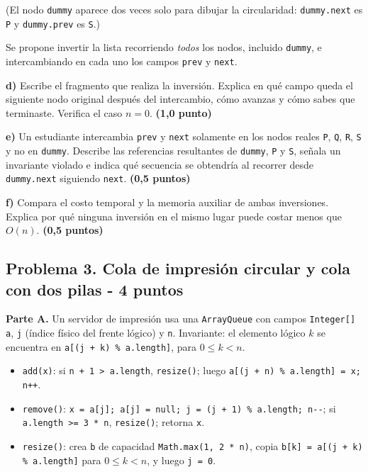 \documentclass[11pt,a4paper]{article}
\newcommand{\pts}[1]{\textbf{(#1)}}
\begin{document}
(El nodo \texttt{dummy} aparece dos veces solo para dibujar la circularidad: \texttt{dummy.next} es \texttt{P} y \texttt{dummy.prev} es \texttt{S}.)

Se propone invertir la lista recorriendo \emph{todos} los nodos, incluido \texttt{dummy}, e intercambiando en cada uno los campos \texttt{prev} y \texttt{next}.

\textbf{d)} Escribe el fragmento que realiza la inversión. Explica en qué campo queda el siguiente nodo original después del intercambio, cómo avanzas y cómo sabes que terminaste. Verifica el caso $n = 0$. \pts{1,0 punto}

\textbf{e)} Un estudiante intercambia \texttt{prev} y \texttt{next} solamente en los nodos reales \texttt{P}, \texttt{Q}, \texttt{R}, \texttt{S} y no en \texttt{dummy}. Describe las referencias resultantes de \texttt{dummy}, \texttt{P} y \texttt{S}, señala un invariante violado e indica qué secuencia se obtendría al recorrer desde \texttt{dummy.next} siguiendo \texttt{next}. \pts{0,5 puntos}

\textbf{f)} Compara el costo temporal y la memoria auxiliar de ambas inversiones. Explica por qué ninguna inversión en el mismo lugar puede costar menos que $O(n)$. \pts{0,5 puntos}

\newpage
\subsection*{Problema 3. Cola de impresión circular y cola con dos pilas - 4 puntos}

\textbf{Parte A.} Un servidor de impresión usa una \texttt{ArrayQueue} con campos \texttt{Integer[] a}, \texttt{j} (índice físico del frente lógico) y \texttt{n}. Invariante: el elemento lógico $k$ se encuentra en \texttt{a[(j + k) \% a.length]}, para $0 \le k < n$.

\begin{itemize}[itemsep=0pt]
\item \texttt{add(x)}: si \texttt{n + 1 > a.length}, \texttt{resize()}; luego \texttt{a[(j + n) \% a.length] = x; n++}.
\item \texttt{remove()}: \texttt{x = a[j]; a[j] = null; j = (j + 1) \% a.length; n-{}-}; si \texttt{a.length >= 3 * n}, \texttt{resize()}; retorna \texttt{x}.
\item \texttt{resize()}: crea \texttt{b} de capacidad \texttt{Math.max(1, 2 * n)}, copia \texttt{b[k] = a[(j + k) \% a.length]} para $0 \le k < n$, y luego \texttt{j = 0}.
\end{itemize}
\end{document}
